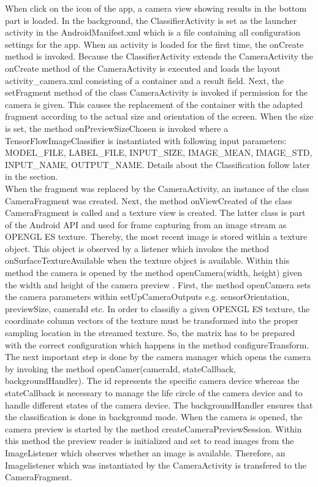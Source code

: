 When click on the icon of the app, a camera view showing results in the bottom part is loaded. In the background, the ClassifierActivity is set as the launcher activity in the AndroidManifest.xml which is a file containing all configuration settings for the app. When an activity is loaded for the first time, the onCreate method is invoked. Because the ClassifierActivity extends the CameraActivity the onCreate method of the CameraActivity is executed and loads the layout activity_camera.xml consisting of a container and a result field. Next, the setFragment method of the class CameraActivity is invoked if permission for the camera is given. This causes the replacement of the container with the adapted fragment according to the actual size and orientation of the screen. When the size is set, the method onPreviewSizeChosen is invoked where a TensorFlowImageClassifier is instantiated with following input parameters: MODEL_FILE, LABEL_FILE, INPUT_SIZE, IMAGE_MEAN, IMAGE_STD, INPUT_NAME, OUTPUT_NAME. Details about the Classification follow later in the section.\\

When the fragment was replaced by the CameraActivity, an instance of the class CameraFragment was created. Next, the method onViewCreated of the class CameraFragment is called and a texture view is created. The latter class is part of the Android API and used for frame capturing from an image stream as OPENGL ES texture. Thereby, the most recent image is stored within a texture object. This object is observed by a listener which invokes the method onSurfaceTextureAvailable when the texture object is available. Within this method the camera is opened by the method openCamera(width, height) given the width and height of the camera preview \citep{AndroidDevelopers}. First, the method openCamera sets the camera parameters within setUpCameraOutputs e.g. sensorOrientation, previewSize, cameraId etc. In order to classifiy a given OPENGL ES texture, the coordinate column vectors of the texture must be transformed into the proper sampling location in the streamed texture. So, the matrix has to be prepared with the correct configuration which happens in the method configureTransform. The next important step is done by the camera manager which opens the camera by invoking the method openCamer(cameraId, stateCallback, backgroundHandler). The id represents the specific camera device whereas the stateCallback is necessary to manage the life circle of the camera device and to handle different states of the camera device. The backgroundHandler ensures that the classification is done in background mode. When the camera is opened, the camera preview is started by the method createCameraPreviewSession. Within this method the preview reader is initialized and set to read images from the ImageListener which observes whether an image is available. Therefore, an Imagelistener which was instantiated by the CameraActivity is transfered to the CameraFragment. \\

